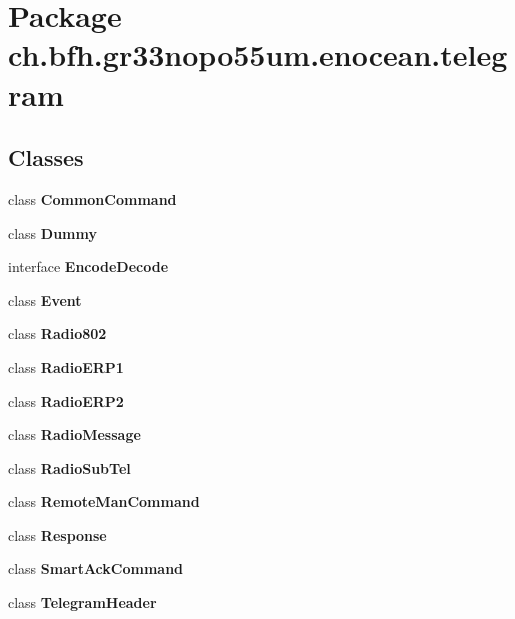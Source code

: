 \section{Package ch.\+bfh.\+gr33nopo55um.\+enocean.\+telegram}
\label{namespacech_1_1bfh_1_1gr33nopo55um_1_1enocean_1_1telegram}
\subsection*{Classes}
\begin{DoxyCompactItemize}
\item 
class {\bf Common\+Command}
\item 
class {\bf Dummy}
\item 
interface {\bf Encode\+Decode}
\item 
class {\bf Event}
\item 
class {\bf Radio802}
\item 
class {\bf Radio\+E\+R\+P1}
\item 
class {\bf Radio\+E\+R\+P2}
\item 
class {\bf Radio\+Message}
\item 
class {\bf Radio\+Sub\+Tel}
\item 
class {\bf Remote\+Man\+Command}
\item 
class {\bf Response}
\item 
class {\bf Smart\+Ack\+Command}
\item 
class {\bf Telegram\+Header}
\end{DoxyCompactItemize}
